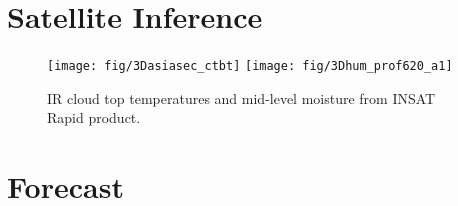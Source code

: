 \documentclass[10pt,usletter]{article} %
\begin{document}



\section{Satellite Inference}
\begin{figure}[H]
\centering
\texttt{[image: fig/3Dasiasec\_ctbt]}
\texttt{[image: fig/3Dhum\_prof620\_a1]}
\caption{IR cloud top temperatures and mid-level moisture from INSAT Rapid product.}
\end{figure}






\section{Forecast}



\end{document}

